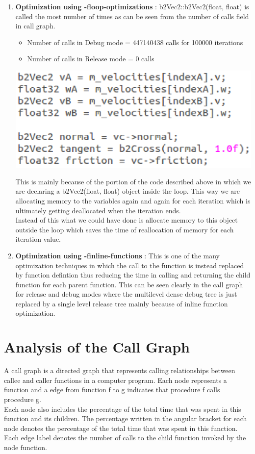 \documentclass[11pt, a4paper]{article}
\begin{document}
\begin{enumerate}
\item \textbf{Optimization using -floop-optimizations} : b2Vec2::b2Vec2(float, float) is called the most number of times as can be seen from the number of calls field in call graph.
\begin{itemize}
\item Number of calls in Debug mode = 447140438 calls for 100000 iterations   
\item Number of calls in Release mode = 0 calls
\end{itemize}
\begin{center}
\includegraphics{ReportImages/point2.eps}
\end{center}
This is mainly because of the portion of the code described above in which we are declaring a b2Vec2(float, float) object inside the loop. This way we are allocating memory to the variables again and again for each iteration which is ultimately getting deallocated when the iteration ends. \\
Instead of this what we could have done is allocate memory to this object outside the loop which saves the time of reallocation of memory for each iteration value.

\item \textbf{Optimization using -finline-functions} : This is one of the many optimization techniques in which the call to the function is instead replaced by function defintion thus reducing the time in calling and returning the child function for each parent function. This can be seen clearly in the call graph for release and debug modes where the multilevel dense debug tree is just replaced by a single level release tree mainly because of inline function optimization. 


\end{enumerate}

\section{Analysis of the Call Graph}
A call graph is a directed graph that represents calling relationships between callee and caller functions in a computer program. Each node represents a function and a edge from function f to g indicates that procedure f calls procedure g. \\
Each node also includes the percentage of the total time that was spent in this function and its children. The percentage written in the angular bracket for each node denotes the percentage of the total time that was spent in this function.
Each edge label denotes the number of calls to the child function invoked by the node function.
 
\end{document}
